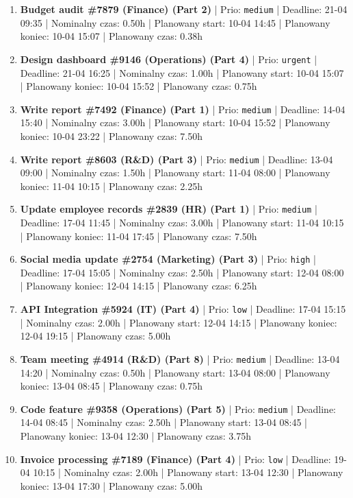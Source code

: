 {\begin{enumerate}
  \item [\textbf{14644}] \textbf{Budget audit \#7879 (Finance) (Part 2)} | Prio: \texttt{medium} | Deadline: 21-04 09:35 | Nominalny czas: 0.50h | Planowany start: 10-04 14:45 | Planowany koniec: 10-04 15:07 | Planowany czas: 0.38h
  \item [\textbf{14606}] \textbf{Design dashboard \#9146 (Operations) (Part 4)} | Prio: \texttt{urgent} | Deadline: 21-04 16:25 | Nominalny czas: 1.00h | Planowany start: 10-04 15:07 | Planowany koniec: 10-04 15:52 | Planowany czas: 0.75h
  \item [\textbf{14642}] \textbf{Write report \#7492 (Finance) (Part 1)} | Prio: \texttt{medium} | Deadline: 14-04 15:40 | Nominalny czas: 3.00h | Planowany start: 10-04 15:52 | Planowany koniec: 10-04 23:22 | Planowany czas: 7.50h
  \item [\textbf{14634}] \textbf{Write report \#8603 (R\&D) (Part 3)} | Prio: \texttt{medium} | Deadline: 13-04 09:00 | Nominalny czas: 1.50h | Planowany start: 11-04 08:00 | Planowany koniec: 11-04 10:15 | Planowany czas: 2.25h
  \item [\textbf{14670}] \textbf{Update employee records \#2839 (HR) (Part 1)} | Prio: \texttt{medium} | Deadline: 17-04 11:45 | Nominalny czas: 3.00h | Planowany start: 11-04 10:15 | Planowany koniec: 11-04 17:45 | Planowany czas: 7.50h
  \item [\textbf{14611}] \textbf{Social media update \#2754 (Marketing) (Part 3)} | Prio: \texttt{high} | Deadline: 17-04 15:05 | Nominalny czas: 2.50h | Planowany start: 12-04 08:00 | Planowany koniec: 12-04 14:15 | Planowany czas: 6.25h
  \item [\textbf{14696}] \textbf{API Integration \#5924 (IT) (Part 4)} | Prio: \texttt{low} | Deadline: 17-04 15:15 | Nominalny czas: 2.00h | Planowany start: 12-04 14:15 | Planowany koniec: 12-04 19:15 | Planowany czas: 5.00h
  \item [\textbf{14638}] \textbf{Team meeting \#4914 (R\&D) (Part 8)} | Prio: \texttt{medium} | Deadline: 13-04 14:20 | Nominalny czas: 0.50h | Planowany start: 13-04 08:00 | Planowany koniec: 13-04 08:45 | Planowany czas: 0.75h
  \item [\textbf{14661}] \textbf{Code feature \#9358 (Operations) (Part 5)} | Prio: \texttt{medium} | Deadline: 14-04 08:45 | Nominalny czas: 2.50h | Planowany start: 13-04 08:45 | Planowany koniec: 13-04 12:30 | Planowany czas: 3.75h
  \item [\textbf{14678}] \textbf{Invoice processing \#7189 (Finance) (Part 4)} | Prio: \texttt{low} | Deadline: 19-04 10:15 | Nominalny czas: 2.00h | Planowany start: 13-04 12:30 | Planowany koniec: 13-04 17:30 | Planowany czas: 5.00h

\end{enumerate}}
